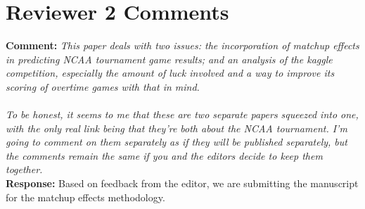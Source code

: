 \documentclass[11pt]{article} %
\begin{document}
\section*{Reviewer 2 Comments}
{\bf Comment:} \emph{This paper deals with two issues: the incorporation of matchup effects in predicting NCAA tournament game results; and an analysis of the kaggle competition, especially the amount of luck involved and a way to improve its scoring of overtime games with that in mind.\\
\\
To be honest, it seems to me that these are two separate papers squeezed into one, with the only real link being that they're both about the NCAA tournament. I'm going to comment on them separately as if they will be published separately, but the comments remain the same if you and the editors decide to keep them together.\\}
{\bf Response:} Based on feedback from the editor, we are submitting the manuscript for the matchup effects methodology.\\
\\
\end{document}
